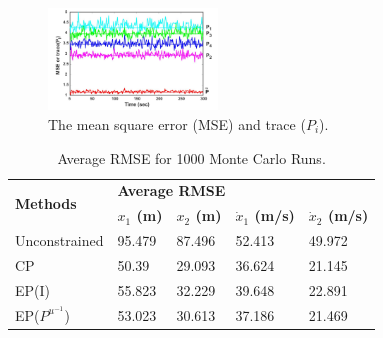 \documentclass{ieeeaccess}
\begin{document}
\begin{figure}[t!]
\centering
\caption{The mean square error (MSE) and trace ($P_i$).}
\label{cpf_result_image}
\includegraphics[width=0.4\textwidth]{cpf_result_image.png}
\end{figure}

\begin{table}
\centering
\begin{tabular}{lllll}
\hline
\multirow{2}{*}{\textbf{Methods}} & \multicolumn{4}{l}{\textbf{Average RMSE}} \\ \cline{2-5} 
                  &     \textbf{$x_1$ (m)} & \textbf{$x_2$ (m)}     &  \textbf{$\dot{x}_1$ (m/s)}   &  \textbf{$\dot{x}_2$ (m/s)}  \\ \hline
             Unconstrained     &   95.479  &   87.496  &   52.413  &  49.972  \\
               CP   &  50.39   &   29.093  &  36.624   &  21.145  \\
               EP(I)   &   55.823  &  32.229   &  39.648   &  22.891  \\
               EP(${P^{u^{-1}}}$)   &  53.023   &   30.613  &   37.186  &  21.469  \\ \hline
\end{tabular}
\label{cpf_result_table}
\caption{Average RMSE for 1000 Monte Carlo Runs.}
\end{table}



\end{document}
